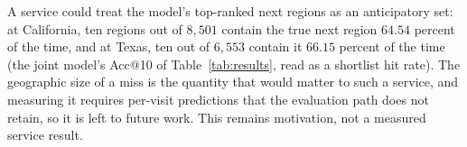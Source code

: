 A service could treat the model's top-ranked next regions as an anticipatory set: at California,
ten regions out of $8{,}501$ contain the true next region $64.54$ percent of the time, and at
Texas, ten out of $6{,}553$ contain it $66.15$ percent of the time (the joint model's Acc@10 of
Table~\ref{tab:results}, read as a shortlist hit rate). The geographic size of a miss is the
quantity that would matter to such a service, and measuring it requires per-visit predictions that
the evaluation path does not retain, so it is left to future work. This remains motivation, not a
measured service result.
